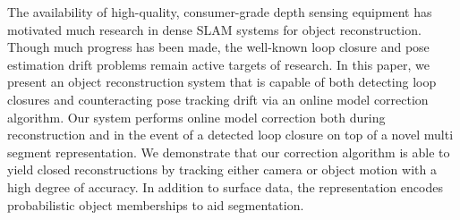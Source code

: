 The availability of high-quality, consumer-grade depth sensing equipment has motivated much research in dense SLAM systems for
object reconstruction. Though much progress has been made, the well-known loop closure and pose estimation drift problems remain 
active targets of research.
In this paper, we present an object reconstruction system that is capable of both detecting loop closures and counteracting pose tracking drift via an online model correction algorithm. Our system performs online model correction both during reconstruction and in the event of a detected loop closure on top of a novel multi segment representation. We demonstrate that our correction algorithm is able to yield closed reconstructions by tracking either camera or object motion with a high degree of accuracy. In addition to surface data, the representation encodes probabilistic object memberships to aid segmentation.